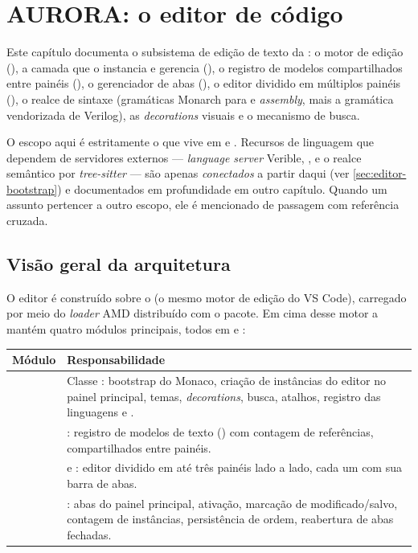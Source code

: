 \chapter{AURORA: o editor de código}
\label{cap:06-aurora-editor}

Este capítulo documenta o subsistema de edição de texto da : o
motor de edição (), a camada que o instancia e gerencia
(), o registro de modelos compartilhados entre painéis
(), o gerenciador de abas (), o
editor dividido em múltiplos painéis (), o realce de
sintaxe (gramáticas Monarch para \cmm{} e \emph{assembly}, mais a gramática
vendorizada de Verilog), as \emph{decorations} visuais e o mecanismo de busca.

O escopo aqui é estritamente o que vive em  e .
Recursos de linguagem que dependem de servidores externos --- \emph{language
server} Verible, ,  e o realce semântico por
\emph{tree-sitter} --- são apenas \emph{conectados} a partir daqui (ver
\autoref{sec:editor-bootstrap}) e documentados em profundidade em outro
capítulo. Quando um assunto pertencer a outro escopo, ele é mencionado de
passagem com referência cruzada.

\section{Visão geral da arquitetura}
\label{sec:editor-overview}

O editor é construído sobre o  (o mesmo motor de edição do
VS Code), carregado por meio do \emph{loader} AMD distribuído com o pacote. Em
cima desse motor a  mantém quatro módulos principais, todos em
 e :

\begin{tabularx}{\linewidth}{Y Y}
\toprule
\textbf{Módulo} & \textbf{Responsabilidade} \\
\midrule
{} & Classe : bootstrap do Monaco, criação de instâncias do editor no painel principal, temas, \emph{decorations}, busca, atalhos, registro das linguagens \cmm{} e . \\
 & : registro de modelos de texto () com contagem de referências, compartilhados entre painéis. \\
 &  e : editor dividido em até três painéis lado a lado, cada um com sua barra de abas. \\
 & : abas do painel principal, ativação, marcação de modificado/salvo, contagem de instâncias, persistência de ordem, reabertura de abas fechadas. \\
\bottomrule
\end{tabularx}

